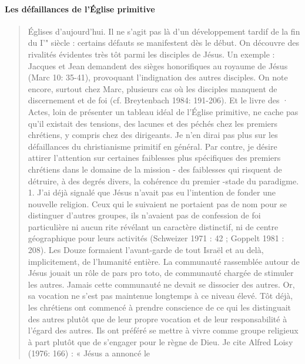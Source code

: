 \paragraph{Les défaillances de l'Église primitive}

\begin{quote}
     
\end{quote}

\begin{quote} 
    Églises d'aujourd'hui. Il ne s'agit pas là d'un développement tardif
de la fin du I'" siècle : certains défauts se manifestent dès le début. On
découvre des rivalités évidentes très tôt parmi les disciples de Jésus. Un
exemple : Jacques et Jean demandent des sièges honorifiques au
royaume de Jésus (Marc 10: 35-41), provoquant l'indignation des
autres disciples. On note encore, surtout chez Marc, plusieurs cas où
les disciples manquent de discernement et de foi (cf. Breytenbach
1984: 191-206). Et le livre des · Actes, loin de présenter un tableau
idéal de l'Église primitive, ne cache pas qu'il existait des tensions, des
lacunes et des péchés chez les premiers chrétiens, y compris chez des
dirigeants.
Je n'en dirai pas plus sur les défaillances du christianisme primitif
en général. Par contre, je désire attirer l'attention sur certaines
faiblesses plus spécifiques des premiers chrétiens dans le domaine de
la mission - des faiblesses qui risquent de détruire, à des degrés divers,
la cohérence du premier -stade du paradigme.
1. J'ai déjà signalé que Jésus n'avait pas eu l'intention de fonder
une nouvelle religion. Ceux qui le suivaient ne portaient pas de nom
pour se distinguer d'autres groupes, ils n'avaient pas de confession de
foi particulière ni aucun rite révélant un caractère distinctif, ni de
centre géographique pour leurs activités (Schweizer 1971 : 42 ;
Goppelt 1981 : 208). Les Douze formaient l'avant-garde de tout Israël
et au delà, implicitement, de l'humanité entière. La communauté
rassemblée autour de Jésus jouait un rôle de pars pro toto, de
communauté chargée de stimuler les autres. Jamais cette communauté
ne devait se dissocier des autres.
Or, sa vocation ne s'est pas maintenue longtemps à ce niveau élevé.
Tôt déjà, les chrétiens ont commencé à prendre conscience de ce qui
les distinguait des autres plutôt que de leur propre vocation et de leur
responsabilité à l'égard des autres. Ils ont préféré se mettre à vivre
comme groupe religieux à part plutôt que de s'engager pour le règne
de Dieu. Je cite Alfred Loisy (1976: 166) : « Jésus a annoncé le

\end{quote}
